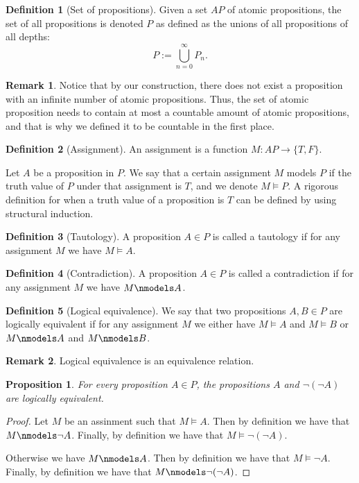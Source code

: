 \documentclass[11pt,a4paper]{article}
\theoremstyle{definition}
\newtheorem{definition}{Definition}[section]
\newtheorem{remark}{Remark}[section]
\theoremstyle{plain}
\newtheorem{proposition}[theorem]{Proposition}
\begin{document}
  \begin{definition}[Set of propositions]
    Given a set $AP$ of atomic propositions, the set of all propositions
    is denoted $P$ as defined as the unions of all propositions of all
    depths:
    \[
      P := \bigcup_{n=0}^{\infty} P_n.
    \]
  \end{definition}

  \begin{remark}
    Notice that by our construction, there does not exist a proposition
    with an infinite number of atomic propositions. Thus, the set of
    atomic proposition needs to contain at most a countable amount
    of atomic propositions, and that is why we defined it to be
    countable in the first place.
  \end{remark}

  \begin{definition}[Assignment]
    An assignment is a function $M \colon AP \to \{T,F\}$.
  \end{definition}

  Let $A$ be a proposition in $P$.
  We say that a certain assignment $M$ models $P$ if the truth
  value of $P$ under that assignment is $T$, and we denote $M \models P$.
  A rigorous definition for when a truth value of a proposition is $T$ 
  can be defined by using structural induction.

  \begin{definition}[Tautology]
    A proposition $A \in P$ is called a tautology if for any assignment
    $M$ we have $M \models A$.
  \end{definition}

  \begin{definition}[Contradiction]
    A proposition $A \in P$ is called a contradiction if for any assignment
    $M$ we have $M \nmodels A$.
  \end{definition}
  
  \begin{definition}[Logical equivalence]
    We say that two propositions $A,B \in P$ are logically equivalent
    if for any assignment $M$ we either have $M \models A$ and
    $M \models B$ or $M \nmodels A$ and $M \nmodels B$.
  \end{definition}

  \begin{remark}
    Logical equivalence is an equivalence relation.
  \end{remark}

  \begin{proposition}
    For every proposition $A \in P$, the propositions $A$ and
    $\neg(\neg A)$ are logically equivalent.
  \end{proposition}
  \begin{proof}
    Let $M$ be an assinment such that $M \models A$.
    Then by definition we have that $M \nmodels \neg A$.
    Finally, by definition we have that $M \models \neg(\neg A)$.

    Otherwise we have $M \nmodels A$.
    Then by definition we have that $M \models \neg A$.
    Finally, by definition we have that $M \nmodels \neg(\neg A)$.
  \end{proof}
\end{document}
